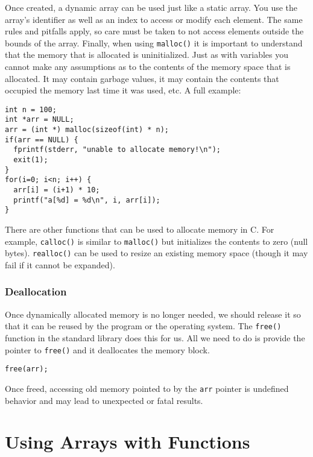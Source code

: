 Once created, a dynamic array can be used just like a static
array.  You use the array's identifier as well as an index to
access or modify each element.  The same rules and pitfalls
apply, so care must be taken to not access elements outside
the bounds of the array.  Finally, when using \texttt{malloc()}
it is important to understand that the memory that is allocated
is uninitialized.  Just as with variables you cannot make any
assumptions as to the contents of the memory space that is
allocated.  It may contain garbage values, it may contain the
contents that occupied the memory last time it was used, 
etc.  A full example:

\begin{verbatim}
int n = 100;
int *arr = NULL;
arr = (int *) malloc(sizeof(int) * n);
if(arr == NULL) {
  fprintf(stderr, "unable to allocate memory!\n");
  exit(1);
}
for(i=0; i<n; i++) {
  arr[i] = (i+1) * 10;
  printf("a[%d] = %d\n", i, arr[i]);
}
\end{verbatim}

There are other functions that can be used to allocate memory
in C.  For example, \texttt{calloc()} is similar to 
\texttt{malloc()} but initializes the contents
to zero (null bytes).  \texttt{realloc()} can be used to resize
an existing memory space (though it may fail if it cannot be 
expanded).  

\subsubsection{Deallocation}

Once dynamically allocated memory is no longer needed, we 
should release it so that it can be reused by the program or the
operating system.  The \texttt{free()} function in the
standard library does this for us.  All we need to do is provide
the pointer to \texttt{free()} and it deallocates the
memory block.

\begin{verbatim}
free(arr);
\end{verbatim}

Once freed, accessing old memory pointed to by the \texttt{arr}
pointer is undefined behavior and may lead to unexpected or fatal
results.  

\section{Using Arrays with Functions}

